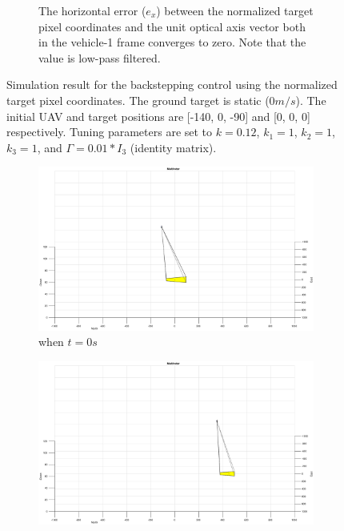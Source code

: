 \begin{figure}
\begin{subfigure}[b]{0.8\linewidth}
		\caption{The horizontal error ($e_x$) between the normalized target pixel coordinates and the unit optical axis vector both in the vehicle-1 frame converges to zero. Note that the value is low-pass filtered.}
	\end{subfigure}	
	\caption{Simulation result for the backstepping control using the normalized target pixel coordinates. The ground target is static ($0m/s$). The initial UAV and target positions are [-140, 0, -90] and [0, 0, 0] respectively. Tuning parameters are set to $k=0.12$, $k_1=1$, $k_2=1$, $k_3=1$, and $\Gamma=0.01*I_3$ (identity matrix).}
	\label{image_0mps}
\end{figure}

\begin{figure}
	\centering
	\begin{subfigure}[b]{0.32\linewidth}
		\includegraphics[width=\textwidth]{images/chapter4/image_UAV_5mps}
		\caption{when $t=0s$}
	\end{subfigure}
	\begin{subfigure}[b]{0.32\linewidth}
		\includegraphics[width=\textwidth]{images/chapter4/image_UAV_5mps_90s}

\end{subfigure}
\end{figure}
